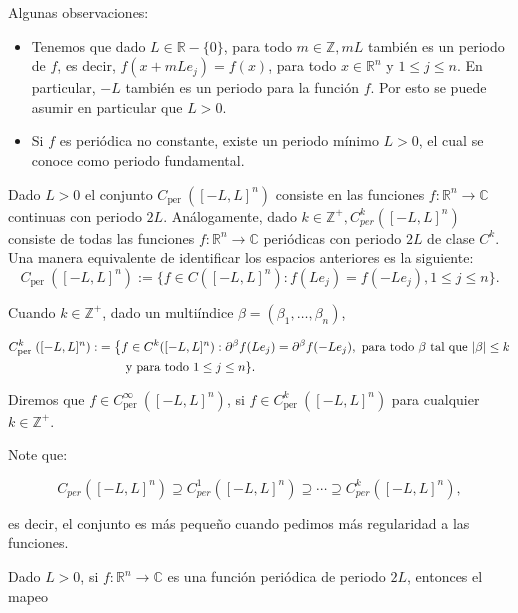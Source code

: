 \documentclass[12pt]{article}
\newcommand\R{\ensuremath{\mathbb{R}}}
\begin{document}
Algunas observaciones:
\begin{itemize}
    \item  Tenemos que dado $L\in \R-\{0\}$, para todo $m \in \mathbb{Z}, m L$ también es un periodo de $f$, es  decir, $f(x+m L e_j)=f(x)$, para todo $x \in \mathbb{R}^n $ y $1\leq j\leq n$. En particular, $-L$ también es un periodo para la función $f$. Por esto se puede asumir en particular que $L>0$.
    
    \item Si $f$ es periódica no constante, existe un periodo mínimo $L>0$, el cual se conoce como periodo fundamental.
\end{itemize}

\begin{note}
    Dado $L>0$ el conjunto $C_{\text {per }}([-L, L]^n)$ consiste en las funciones $f: \mathbb{R}^n \rightarrow \mathbb{C}$ continuas con periodo $2L$. Análogamente, dado $k \in \mathbb{Z}^{+}, C_{p e r}^k([-L, L]^n)$ consiste de todas las funciones $f: \mathbb{R}^n \rightarrow \mathbb{C}$ periódicas con periodo $2 L$ de clase $C^k$.\\

Una manera equivalente de identificar los espacios anteriores es la siguiente:
$$
C_{\text {per }}([-L, L]^n):=\{f \in C([-L, L]^n): f(Le_j)=f(-Le_j), 1\leq j\leq n\}.
$$


Cuando $k \in \mathbb{Z}^{+}$, dado un multiíndice $\beta=(\beta_1,\ldots,\beta_n)$,

\begin{align*}
    C_{\text {per }}^k([-L, L]^n):&=\left\{f \in C^k([-L, L]^n): \partial^{\beta}f(Le_j)=\partial^{\beta}f(-Le_j), \text{ para todo } \beta \text{ tal que } |\beta|\leq k\right. \\
    &\hspace{0.8cm} \text{y para todo } 1\leq j\leq n\}.
\end{align*}

Diremos que $f \in C_{\text {per }}^{\infty}([-L, L]^n)$, si $f \in C_{\text {per }}^k([-L, L]^n)$ para cualquier $k \in \mathbb{Z}^{+}$.
\end{note}


Note que:

$$
C_{p e r}([-L, L]^n) \supseteq C_{p e r}^1([-L, L]^n) \supseteq \cdots \supseteq C_{p e r}^k([-L, L]^n),
$$

es decir, el conjunto es más pequeño cuando pedimos más regularidad a las funciones.

Dado $L>0$, si $f: \mathbb{R}^n \rightarrow \mathbb{C}$ es una función periódica de periodo $2 L$, entonces el mapeo
\end{document}
